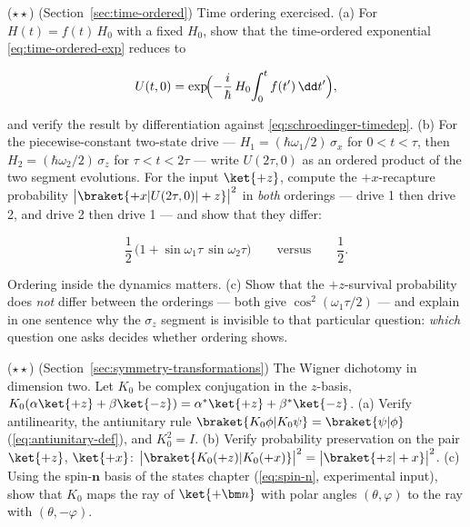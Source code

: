 \begin{problemset}
\item ($\star\star$) (Section~\ref{sec:time-ordered}) Time ordering exercised. (a) For $H(t) = f(t)\,H_0$ with a fixed $H_0$, show that the time-ordered exponential \eqref{eq:time-ordered-exp} reduces to
\begin{linenomath}
    \begin{equation}
        U(t,0) = \exp\!\Bigl(-\frac{i}{\hbar}\,H_0\!\int_0^t f(t')\,\dd t'\Bigr) ,
    \end{equation}
\end{linenomath}
and verify the result by differentiation against \eqref{eq:schroedinger-timedep}. (b) For the piecewise-constant two-state drive --- $H_1 = (\hbar\omega_1/2)\,\sigma_x$ for $0 < t < \tau$, then $H_2 = (\hbar\omega_2/2)\,\sigma_z$ for $\tau < t < 2\tau$ --- write $U(2\tau,0)$ as an ordered product of the two segment evolutions. For the input $\ket{+z}$, compute the $+x$-recapture probability $\bigl|\braket{+x|U(2\tau,0)|+z}\bigr|^2$ in \emph{both} orderings --- drive 1 then drive 2, and drive 2 then drive 1 --- and show that they differ:
\begin{linenomath}
    \begin{equation}
        \frac{1}{2}\,\bigl(1 + \sin\omega_1\tau\,\sin\omega_2\tau\bigr)
        \qquad\text{versus}\qquad
        \frac{1}{2} .
    \end{equation}
\end{linenomath}
Ordering inside the dynamics matters. (c) Show that the $+z$-survival probability does \emph{not} differ between the orderings --- both give $\cos^2(\omega_1\tau/2)$ --- and explain in one sentence why the $\sigma_z$ segment is invisible to that particular question: \emph{which} question one asks decides whether ordering shows.

\item ($\star\star$) (Section~\ref{sec:symmetry-transformations}) The Wigner dichotomy in dimension two. Let $K_0$ be complex conjugation in the $z$-basis, $K_0(\alpha\ket{+z} + \beta\ket{-z}) = \alpha^*\ket{+z} + \beta^*\ket{-z}$. (a) Verify antilinearity, the antiunitary rule $\braket{K_0\phi|K_0\psi} = \braket{\psi|\phi}$ (\eqref{eq:antiunitary-def}), and $K_0^2 = I$. (b) Verify probability preservation on the pair $\ket{+z}$, $\ket{+x}$: $\bigl|\braket{K_0(+z)|K_0(+x)}\bigr|^2 = \bigl|\braket{+z|+x}\bigr|^2$. (c) Using the spin-$\bm n$ basis of the states chapter (\eqref{eq:spin-n}, experimental input), show that $K_0$ maps the ray of $\ket{+\bm n}$ with polar angles $(\theta,\varphi)$ to the ray with $(\theta,-\varphi)$.


\end{problemset}
